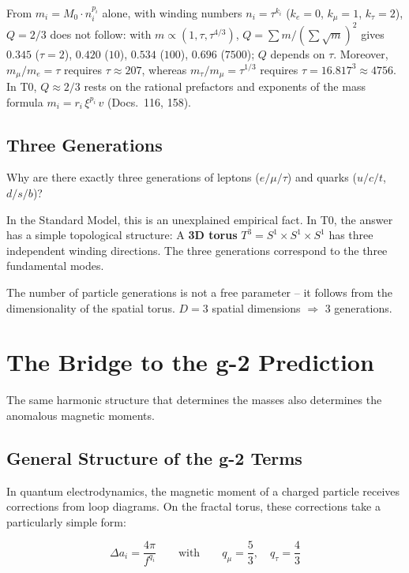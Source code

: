 	From $m_i = M_0 \cdot n_i^{p_i}$ alone, with winding numbers $n_i = \tau^{k_i}$ ($k_e = 0$, $k_\mu = 1$, $k_\tau = 2$), $Q = 2/3$ does not follow: with $m \propto (1, \tau, \tau^{4/3})$, $Q = \sum m/(\sum\sqrt{m})^2$ gives $0.345$ ($\tau = 2$), $0.420$ ($10$), $0.534$ ($100$), $0.696$ ($7500$); $Q$ depends on $\tau$. Moreover, $m_\mu/m_e = \tau$ requires $\tau \approx 207$, whereas $m_\tau/m_\mu = \tau^{1/3}$ requires $\tau = 16.817^3 \approx 4756$. In T0, $Q \approx 2/3$ rests on the rational prefactors and exponents of the mass formula $m_i = r_i\,\xi^{p_i}\,v$ (Docs.~116, 158).
	
	\subsection{Three Generations}
	
	Why are there exactly three generations of leptons ($e/\mu/\tau$) and quarks ($u/c/t$, $d/s/b$)?
	
	In the Standard Model, this is an unexplained empirical fact. In T0, the answer has a simple topological structure: A \textbf{3D torus} $T^3 = S^1 \times S^1 \times S^1$ has three independent winding directions. The three generations correspond to the three fundamental modes.
	
	\begin{keypoint}
		The number of particle generations is not a free parameter -- it follows from the dimensionality of the spatial torus. $D = 3$ spatial dimensions $\Rightarrow$ 3 generations.
	\end{keypoint}


	\section{The Bridge to the g-2 Prediction}
	
	The same harmonic structure that determines the masses also determines the anomalous magnetic moments.
	
	\subsection{General Structure of the g-2 Terms}
	
	In quantum electrodynamics, the magnetic moment of a charged particle receives corrections from loop diagrams. On the fractal torus, these corrections take a particularly simple form:
	
	\begin{equation}
		\Delta a_i = \frac{4\pi}{f^{q_i}} \qquad \text{with} \qquad q_\mu = \frac{5}{3}, \quad q_\tau = \frac{4}{3}
		\label{eq:g2-fractal}
	\end{equation}
	
